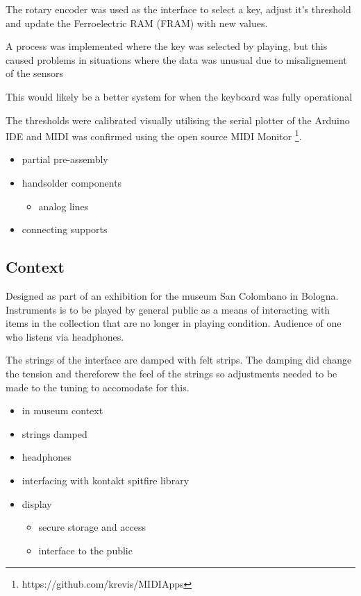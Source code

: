 The rotary encoder was used as the interface to select a key, adjust
it's threshold and update the Ferroelectric RAM (FRAM) with new values.

A process was implemented where the key was selected by playing, but
this caused problems in situations where the data was unusual due to
misalignement of the sensors

This would likely be a better system for when the keyboard was fully
operational

The thresholds were calibrated visually utilising the serial plotter of
the Arduino IDE and MIDI was confirmed using the open source MIDI
Monitor \footnote{https://github.com/krevis/MIDIApps}.

\begin{itemize}
\item
  partial pre-assembly
\item
  handsolder components

  \begin{itemize}
  \item
    analog lines
  \end{itemize}
\item
  connecting supports
\end{itemize}

\subsection{Context}\label{context}

Designed as part of an exhibition for the museum San Colombano in
Bologna. Instruments is to be played by general public as a means of
interacting with items in the collection that are no longer in playing
condition. Audience of one who listens via headphones.

The strings of the interface are damped with felt strips. The damping
did change the tension and thereforew the feel of the strings so
adjustments needed to be made to the tuning to accomodate for this.

\begin{itemize}
\item
  in museum context
\item
  strings damped
\item
  headphones
\item
  interfacing with kontakt spitfire library
\item
  display

  \begin{itemize}
  \item
    secure storage and access
  \item
    interface to the public
  \end{itemize}
\end{itemize}

